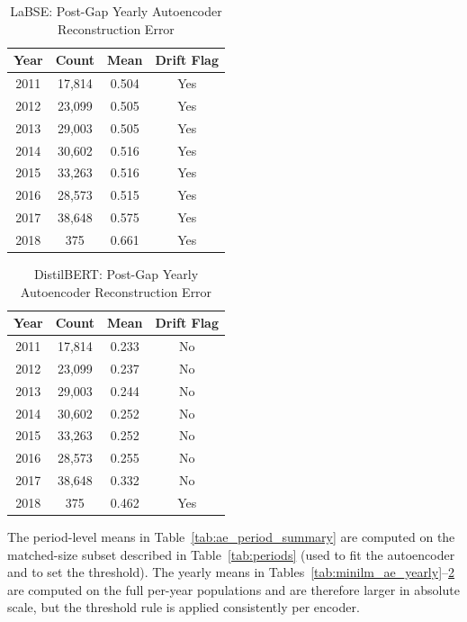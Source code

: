\documentclass[conference]{IEEEtran}
\begin{document}
\begin{table}[htbp]
\caption{LaBSE: Post-Gap Yearly Autoencoder Reconstruction Error}
\label{tab:labse_ae_yearly}
\begin{center}
\begin{tabular}{|c|c|c|c|}
\hline
\textbf{Year} & \textbf{Count} & \textbf{Mean} & \textbf{Drift Flag} \\
\hline
2011 & 17{,}814 & 0.504 & Yes \\
2012 & 23{,}099 & 0.505 & Yes \\
2013 & 29{,}003 & 0.505 & Yes \\
2014 & 30{,}602 & 0.516 & Yes \\
2015 & 33{,}263 & 0.516 & Yes \\
2016 & 28{,}573 & 0.515 & Yes \\
2017 & 38{,}648 & 0.575 & Yes \\
2018 & 375    & 0.661 & Yes \\
\hline
\end{tabular}
\end{center}
\end{table}

\begin{table}[htbp]
\caption{DistilBERT: Post-Gap Yearly Autoencoder Reconstruction Error}
\label{tab:distilbert_ae_yearly}
\begin{center}
\begin{tabular}{|c|c|c|c|}
\hline
\textbf{Year} & \textbf{Count} & \textbf{Mean} & \textbf{Drift Flag} \\
\hline
2011 & 17{,}814 & 0.233 & No \\
2012 & 23{,}099 & 0.237 & No \\
2013 & 29{,}003 & 0.244 & No \\
2014 & 30{,}602 & 0.252 & No \\
2015 & 33{,}263 & 0.252 & No \\
2016 & 28{,}573 & 0.255 & No \\
2017 & 38{,}648 & 0.332 & No \\
2018 & 375    & 0.462 & Yes \\
\hline
\end{tabular}
\end{center}
\end{table}

The period-level means in Table~\ref{tab:ae_period_summary} are computed on the matched-size subset described in Table~\ref{tab:periods} (used to fit the autoencoder and to set the threshold). The yearly means in Tables~\ref{tab:minilm_ae_yearly}--\ref{tab:distilbert_ae_yearly} are computed on the full per-year populations and are therefore larger in absolute scale, but the threshold rule is applied consistently per encoder.
\end{document}
